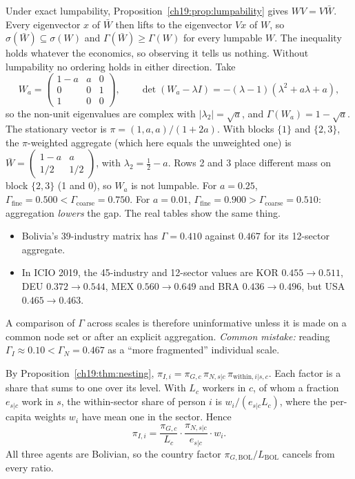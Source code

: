 \documentclass[../solutions_manual.tex]{subfiles}
\begin{document}
 Under exact lumpability, Proposition~\ref{ch19:prop:lumpability} gives $WV = V\bar W$. Every eigenvector $x$ of $\bar W$ then lifts to the eigenvector $Vx$ of $W$, so $\sigma(\bar W) \subseteq \sigma(W)$ and $\Gamma(\bar W) \ge \Gamma(W)$ for every lumpable $W$. The inequality holds whatever the economics, so observing it tells us nothing. Without lumpability no ordering holds in either direction. Take
\[
W_a = \begin{pmatrix} 1-a & a & 0\\ 0 & 0 & 1 \\ 1 & 0 & 0\end{pmatrix},\qquad \det(W_a - \lambda I) = -(\lambda - 1)(\lambda^2 + a\lambda + a),
\]
so the non-unit eigenvalues are complex with $|\lambda_2| = \sqrt a$, and $\Gamma(W_a) = 1-\sqrt a$. The stationary vector is $\pi = (1, a, a)/(1+2a)$. With blocks $\{1\}$ and $\{2,3\}$, the $\pi$-weighted aggregate (which here equals the unweighted one) is $\bar W = \begin{pmatrix} 1-a & a\\ 1/2 & 1/2\end{pmatrix}$, with $\lambda_2 = \tfrac12 - a$. Rows 2 and 3 place different mass on block $\{2,3\}$ (1 and 0), so $W_a$ is not lumpable. For $a = 0.25$, $\Gamma_{\text{fine}} = 0.500 < \Gamma_{\text{coarse}} = 0.750$. For $a = 0.01$, $\Gamma_{\text{fine}} = 0.900 > \Gamma_{\text{coarse}} = 0.510$: aggregation \emph{lowers} the gap. The real tables show the same thing.
\begin{itemize}
\item Bolivia's 39-industry matrix has $\Gamma = 0.410$ against $0.467$ for its 12-sector aggregate.
\item In ICIO 2019, the 45-industry and 12-sector values are KOR $0.455 \to 0.511$, DEU $0.372 \to 0.544$, MEX $0.560 \to 0.649$ and BRA $0.436 \to 0.496$, but USA $0.465 \to 0.463$.
\end{itemize}
A comparison of $\Gamma$ across scales is therefore uninformative unless it is made on a common node set or after an explicit aggregation. \emph{Common mistake:} reading $\Gamma_I \approx 0.10 < \Gamma_N = 0.467$ as a ``more fragmented'' individual scale.


 By Proposition~\ref{ch19:thm:nesting}, $\pi_{I,i} = \pi_{G,c}\,\pi_{N,s|c}\,\pi_{\text{within},i|s,c}$. Each factor is a share that sums to one over its level. With $L_c$ workers in $c$, of whom a fraction $e_{s|c}$ work in $s$, the within-sector share of person $i$ is $w_i/(e_{s|c}L_c)$, where the per-capita weights $w_i$ have mean one in the sector. Hence
\[
\pi_{I,i} = \frac{\pi_{G,c}}{L_c}\cdot\frac{\pi_{N,s|c}}{e_{s|c}}\cdot w_i .
\]
All three agents are Bolivian, so the country factor $\pi_{G,\text{BOL}}/L_{\text{BOL}}$ cancels from every ratio.
\end{document}
